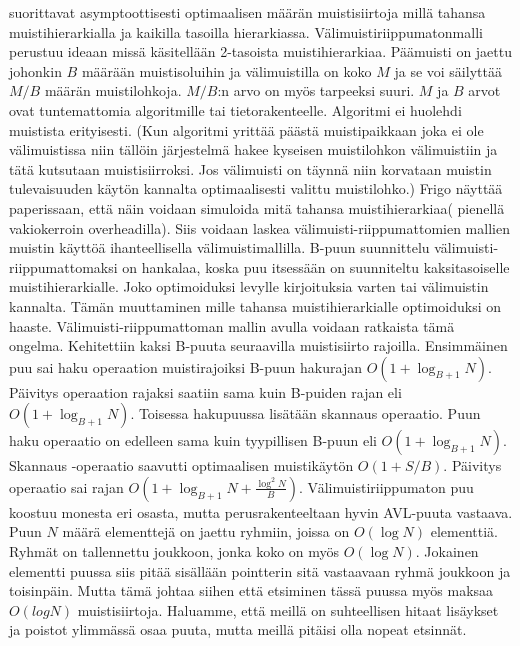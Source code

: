 \documentclass[finnish]{tktltiki2}
\theoremstyle{definition}
\theoremstyle{remark}
\begin{document}
suorittavat asymptoottisesti optimaalisen määrän muistisiirtoja millä tahansa
muistihierarkialla ja kaikilla tasoilla hierarkiassa. Välimuistiriippumatonmalli
perustuu ideaan missä käsitellään 2-tasoista muistihierarkiaa. Päämuisti
on jaettu johonkin \(B\) määrään muistisoluihin ja välimuistilla on koko \(M\) ja se
voi säilyttää \(M/B\) määrän muistilohkoja. \(M/B\):n arvo on myös tarpeeksi suuri.
\(M\) ja \(B\) arvot ovat tuntemattomia algoritmille tai tietorakenteelle. Algoritmi
ei huolehdi muistista erityisesti. (Kun algoritmi yrittää päästä muistipaikkaan
joka ei ole välimuistissa niin tällöin järjestelmä hakee kyseisen muistilohkon
välimuistiin ja tätä kutsutaan muistisiirroksi. Jos välimuisti on täynnä niin
korvataan muistin tulevaisuuden käytön kannalta optimaalisesti valittu
muistilohko.) Frigo näyttää paperissaan, että näin voidaan simuloida mitä
tahansa muistihierarkiaa( pienellä vakiokerroin overheadilla). Siis voidaan
laskea välimuisti-riippumattomien mallien muistin käyttöä ihanteellisella
välimuistimallilla.
\newline \indent B-puun suunnittelu välimuisti-riippumattomaksi on hankalaa, koska puu
itsessään on suunniteltu kaksitasoiselle muistihierarkialle. Joko optimoiduksi
levylle kirjoituksia varten tai välimuistin kannalta. Tämän muuttaminen mille
tahansa muistihierarkialle optimoiduksi on haaste.
\newline \indent Välimuisti-riippumattoman mallin avulla voidaan ratkaista tämä ongelma.
Kehitettiin kaksi B-puuta seuraavilla muistisiirto rajoilla. Ensimmäinen puu sai
haku operaation muistirajoiksi B-puun hakurajan \(O(1 + \log_{B+1} N)\). Päivitys operaation rajaksi
saatiin sama kuin B-puiden rajan eli \(O(1 + \log_{B+1} N)\). Toisessa
hakupuussa lisätään skannaus operaatio. Puun haku operaatio on edelleen sama
kuin tyypillisen B-puun eli \(O(1 + \log_{B+1} N)\). Skannaus -operaatio saavutti optimaalisen
muistikäytön \(O(1+S/B)\). Päivitys operaatio sai rajan
\(O(1+\log_{B+1}N+\tfrac{\log^2 N}{B})\).
\newline \indent Välimuistiriippumaton puu koostuu monesta eri osasta, mutta
perusrakenteeltaan hyvin AVL-puuta vastaava. Puun
\(N\) määrä elementtejä on jaettu ryhmiin, joissa on \(O(\log N)\) elementtiä. Ryhmät on
tallennettu joukkoon, jonka koko on myös \(O(\log N)\). Jokainen elementti puussa
siis pitää sisällään pointterin sitä vastaavaan ryhmä joukkoon ja toisinpäin.
Mutta tämä johtaa siihen että etsiminen tässä puussa myös maksaa \(O(log N)\)
muistisiirtoja. Haluamme, että meillä on suhteellisen hitaat lisäykset
ja poistot ylimmässä osaa puuta, mutta meillä pitäisi olla nopeat etsinnät.
\end{document}

